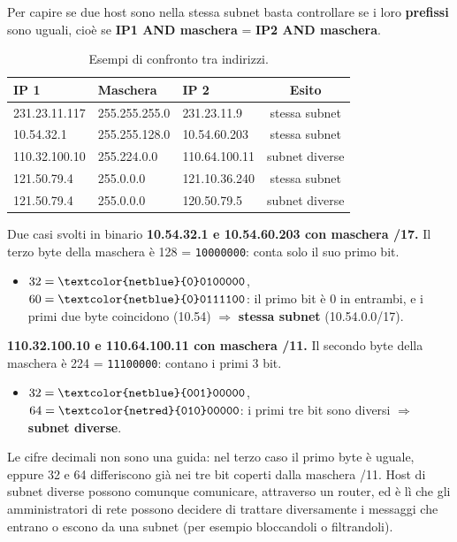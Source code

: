 Per capire se due host sono nella stessa subnet basta controllare se i loro \textbf{prefissi} sono uguali, cioè se
\textbf{IP1 AND maschera} = \textbf{IP2 AND maschera}.

\begin{table}[H]
\centering
\begin{tabular}{lllc}
\toprule
\textbf{IP 1} & \textbf{Maschera} & \textbf{IP 2} & \textbf{Esito} \\
\midrule
231.23.11.117 & 255.255.255.0 & 231.23.11.9 & stessa subnet \\
10.54.32.1 & 255.255.128.0 & 10.54.60.203 & stessa subnet \\
110.32.100.10 & 255.224.0.0 & 110.64.100.11 & subnet diverse \\
121.50.79.4 & 255.0.0.0 & 121.10.36.240 & stessa subnet \\
121.50.79.4 & 255.0.0.0 & 120.50.79.5 & subnet diverse \\
\bottomrule
\end{tabular}
\caption{Esempi di confronto tra indirizzi.}
\end{table}

\begin{esempio}{Due casi svolti in binario}
\textbf{10.54.32.1 e 10.54.60.203 con maschera /17.} Il terzo byte della maschera è 128 = \texttt{10000000}: conta solo il suo
primo bit.
\begin{itemize}
    \item $32 = \texttt{\textcolor{netblue}{0}0100000}$, $60 = \texttt{\textcolor{netblue}{0}0111100}$: il primo bit è 0 in entrambi, e i primi due byte coincidono (10.54) $\Rightarrow$ \textbf{stessa subnet} (10.54.0.0/17).
\end{itemize}
\textbf{110.32.100.10 e 110.64.100.11 con maschera /11.} Il secondo byte della maschera è 224 = \texttt{11100000}: contano i primi 3 bit.
\begin{itemize}
    \item $32 = \texttt{\textcolor{netblue}{001}00000}$, $64 = \texttt{\textcolor{netred}{010}00000}$: i primi tre bit sono diversi $\Rightarrow$ \textbf{subnet diverse}.
\end{itemize}
\end{esempio}

Le cifre decimali non sono una guida: nel terzo caso il primo byte è uguale, eppure 32 e 64 differiscono già nei tre
bit coperti dalla maschera /11. Host di subnet diverse possono comunque comunicare, attraverso un router, ed è lì che gli
amministratori di rete possono decidere di trattare diversamente i messaggi che entrano o escono da una subnet (per esempio
bloccandoli o filtrandoli).

